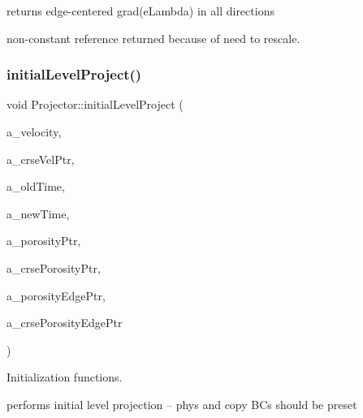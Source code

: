 returns edge-\/centered grad(e\+Lambda) in all directions 

non-\/constant reference returned because of need to rescale. \mbox{\label{class_projector_a4bacdf13f2e4a10653e04042bef587f6}} 
\subsubsection{\texorpdfstring{initial\+Level\+Project()}{initialLevelProject()}}
{\footnotesize\ttfamily void Projector\+::initial\+Level\+Project (\begin{DoxyParamCaption}\item[{\textbf{ Level\+Data}$<$ \textbf{ F\+Array\+Box} $>$ \&}]{a\+\_\+velocity,  }\item[{\textbf{ Level\+Data}$<$ \textbf{ F\+Array\+Box} $>$ $\ast$}]{a\+\_\+crse\+Vel\+Ptr,  }\item[{const \textbf{ Real}}]{a\+\_\+old\+Time,  }\item[{const \textbf{ Real}}]{a\+\_\+new\+Time,  }\item[{const \textbf{ Ref\+Counted\+Ptr}$<$ \textbf{ Level\+Data}$<$ \textbf{ F\+Array\+Box} $>$ $>$}]{a\+\_\+porosity\+Ptr,  }\item[{const \textbf{ Ref\+Counted\+Ptr}$<$ \textbf{ Level\+Data}$<$ \textbf{ F\+Array\+Box} $>$ $>$}]{a\+\_\+crse\+Porosity\+Ptr,  }\item[{const \textbf{ Ref\+Counted\+Ptr}$<$ \textbf{ Level\+Data}$<$ \textbf{ Flux\+Box} $>$ $>$}]{a\+\_\+porosity\+Edge\+Ptr,  }\item[{const \textbf{ Ref\+Counted\+Ptr}$<$ \textbf{ Level\+Data}$<$ \textbf{ Flux\+Box} $>$ $>$}]{a\+\_\+crse\+Porosity\+Edge\+Ptr }\end{DoxyParamCaption})}



Initialization functions. 

performs initial level projection -- phys and copy BC\textquotesingle{}s should be preset \mbox{\label{class_projector_ad4afeedf8d3cbac3778b4952aa967be2}} 
